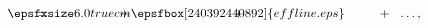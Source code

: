 \begin{equation}\label{Effective_Line_Picture}
\qquad\qquad\qquad\quad
\smash{\epsfxsize6.0truecm\epsfbox[240 392 440 892]{effline.eps}}
\hspace*{-8.6cm} =
\hspace*{1.9cm} +
\hspace*{2.8cm} +
\hspace*{3.7cm} + \ \ \ldots,
\end{equation}

